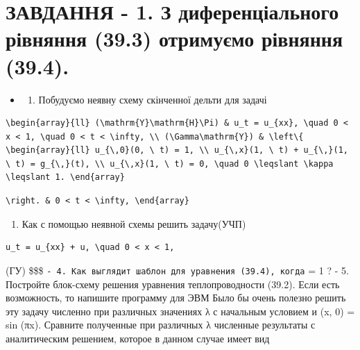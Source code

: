 \documentclass[
  ukrainian,
]{article}
\providecommand{\tightlist}{%
  \setlength{\itemsep}{0pt}\setlength{\parskip}{0pt}}
\begin{document}
\section{ЗАВДАННЯ - 1. З диференціального рівняння (39.3) отримуємо
рівняння
(39.4).}\label{ux437ux430ux432ux434ux430ux43dux43dux44f---1.-ux437-ux434ux438ux444ux435ux440ux435ux43dux446ux456ux430ux43bux44cux43dux43eux433ux43e-ux440ux456ux432ux43dux44fux43dux43dux44f-39.3-ux43eux442ux440ux438ux43cux443ux454ux43cux43e-ux440ux456ux432ux43dux44fux43dux43dux44f-39.4.}

\begin{itemize}
\tightlist
\item
  \begin{enumerate}
  \def\labelenumi{\arabic{enumi}.}
  \setcounter{enumi}{1}
  \tightlist
  \item
    Побудуємо неявну схему скінченної дельти для задачі
  \end{enumerate}
\end{itemize}

\begin{verbatim}
\begin{array}{ll} (\mathrm{Y}\mathrm{H}\Pi) & u_t = u_{xx}, \quad 0 < x < 1, \quad 0 < t < \infty, \\ (\Gamma\mathrm{Y}) & \left\{ \begin{array}{ll} u_{\,0}(0, \ t) = 1, \\ u_{\,x}(1, \ t) + u_{\,}(1, \ t) = g_{\,}(t), \\ u_{\,x}(1, \ t) = 0, \quad 0 \leqslant \kappa \leqslant 1. \end{array}
\end{verbatim}

\begin{verbatim}
\right. & 0 < t < \infty, \end{array}
\end{verbatim}

\begin{enumerate}
\def\labelenumi{\arabic{enumi}.}
\setcounter{enumi}{2}
\tightlist
\item
  Как с помощью неявной схемы решить задачу(УЧП)
\end{enumerate}

\begin{verbatim}
u_t = u_{xx} + u, \quad 0 < x < 1,
\end{verbatim}

(ГУ) \$\$\$
\texttt{-\ 4.\ Как\ выглядит\ шаблон\ для\ уравнения\ (39.4),\ когда}
\lambda = 1 ? - 5. Постройте блок-схему решения уравнения
теплопроводности (39.2). Если есть возможность, то напишите программу
для ЭВМ Было бы очень полезно решить эту задачу численно при различных
значениях λ с начальным условием и (x, 0) = sin (πx). Сравните
полученные при различных λ численные результаты с аналитическим
решением, которое в данном случае имеет вид
\end{document}
